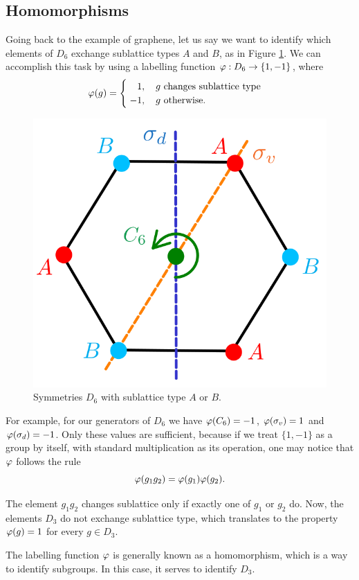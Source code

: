 \subsection{Homomorphisms}

Going back to the example of graphene, let us say we want to identify which elements of $D_6$ exchange sublattice types $A$ and $B$, as in Figure \ref{fig:hexagon_AB}. We can accomplish this task by using a labelling function $\varphi: D_6 \to \{1, -1\}$, where
\begin{align*}
\vphi(g) =
\begin{cases}
\; \P1, \quad g \text{ changes sublattice type} \\
\; -1, \quad g \text{ otherwise.}
\end{cases}
\end{align*}

\begin{figure}[H]
\centering
\includegraphics[width=0.4\linewidth]{fig/hexagon_AB.png}
\caption{Symmetries $D_6$ with sublattice type $A$ or $B$.}
\label{fig:hexagon_AB}
\end{figure}

For example, for our generators of $D_6$ we have $\varphi(C_6) = -1$, $\varphi(\sigma_v) = 1$ and $\varphi(\sigma_d) = -1$. Only these values are sufficient, because if we treat $\{1, -1\}$ as a group by itself, with standard multiplication as its operation, one may notice that $\varphi$ follows the rule
$$
\varphi(g_1 g_2) = \varphi(g_1) \varphi(g_2).
$$

The element $g_1 g_2$ changes sublattice only if exactly one of $g_1$ or $g_2$ do. Now, the elements $D_3$ do not exchange sublattice type, which translates to the property $\varphi(g) = 1$ for every $g \in D_3$.

The labelling function $\varphi$ is generally known as a homomorphism, which is a way to identify subgroups. In this case, it serves to identify $D_3$.

